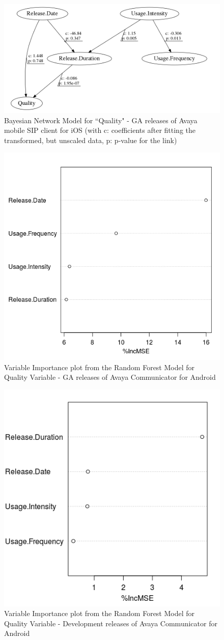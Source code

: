 \documentclass[smallextended]{svjour3}       %
\begin{document}
\begin{figure}[!t]
\centering
\includegraphics[width=0.6\linewidth]{qI}%
\caption{Bayesian Network  Model for ``Quality" - GA releases of Avaya mobile SIP client for iOS (with c: coefficients after fitting the transformed, but unscaled data, p: p-value  for the link)}
\label{fig:bn2I}
\end{figure}


\begin{figure}[!t]
\centering
\includegraphics[width=0.4\linewidth]{rfqAGA}
\caption{Variable Importance plot from the Random Forest  Model for Quality Variable - GA releases of Avaya Communicator for Android}
\label{fig:rf2AGA}
\end{figure}

\begin{figure}[!t]
\centering
\includegraphics[width=0.4\linewidth]{rfqAD}
\caption{Variable Importance plot from the Random Forest  Model for Quality Variable - Development releases of Avaya Communicator for Android}
\label{fig:rf2AD}
\end{figure}
\end{document}

